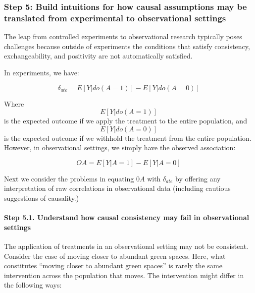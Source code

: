 \documentclass[
  singlecolumn]{article}
\let\oldparagraph\paragraph
\renewcommand{\paragraph}[1]{\oldparagraph{#1}\mbox{}}
\begin{document}
\subsubsection{Step 5: Build intuitions for how causal assumptions may
be translated from experimental to observational
settings}\label{step-5-build-intuitions-for-how-causal-assumptions-may-be-translated-from-experimental-to-observational-settings}

The leap from controlled experiments to observational research typically
poses challenges because outside of experiments the conditions that
satisfy consistency, exchangeability, and positivity are not
automatically satisfied.

In experiments, we have:

\[
\delta_{ate} = E[Y | do(A = 1)] - E[Y | do(A = 0)]
\]

Where \[E[Y | do(A = 1)]\] is the expected outcome if we apply the
treatment to the entire population, and \[E[Y | do(A = 0)]\] is the
expected outcome if we withhold the treatment from the entire
population. However, in observational settings, we simply have the
observed association:

\[
OA = E[Y | A = 1] - E[Y | A = 0]
\]

Next we consider the problems in equating \(0A\) with \(\delta_{ate}\)
by offering any interpretation of raw correlations in observational data
(including cautious suggestions of causality.)

\paragraph{\texorpdfstring{\textbf{Step 5.1. Understand how causal
consistency may fail in observational
settings}}{Step 5.1. Understand how causal consistency may fail in observational settings}}\label{step-5.1.-understand-how-causal-consistency-may-fail-in-observational-settings}

The application of treatments in an observational setting may not be
consistent. Consider the case of moving closer to abundant green spaces.
Here, what constitutes ``moving closer to abundant green spaces'' is
rarely the same intervention across the population that moves. The
intervention might differ in the following ways:
\end{document}

